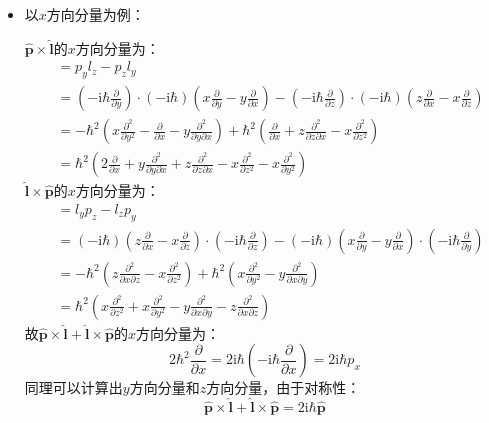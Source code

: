 \documentclass[a4paper,fontset=none]{ctexart}
\begin{document}
\begin{itemize}
        \item[1.30]
        以$x$方向分量为例：

        $\hat{\bm{p}} \times \hat{\bm{l}}$的$x$方向分量为：
        \begin{align*}
            [p_y,l_z]
            &= p_y l_z - p_z l_y \\
            &= \left(-\mathrm{i}\hbar\frac{\partial}{\partial y}\right) \cdot (-\mathrm{i}\hbar)\left(x\frac{\partial}{\partial y} - y\frac{\partial}{\partial x}\right) - \left(-\mathrm{i}\hbar\frac{\partial}{\partial z}\right) \cdot (-\mathrm{i}\hbar)\left(z\frac{\partial}{\partial x} - x\frac{\partial}{\partial z}\right) \\
            &= -\hbar^2\left(x\frac{\partial^2}{\partial y^2} - \frac{\partial}{\partial x} - y\frac{\partial^2}{\partial y \partial x}\right) + \hbar^2\left(\frac{\partial}{\partial x} + z\frac{\partial^2}{\partial z \partial x} - x\frac{\partial^2}{\partial z^2}\right) \\
            &= \hbar^2\left(2\frac{\partial}{\partial x} + y\frac{\partial^2}{\partial y \partial x} + z\frac{\partial^2}{\partial z \partial x} - x\frac{\partial^2}{\partial z^2} - x\frac{\partial^2}{\partial y^2}\right)
        \end{align*}
        $\hat{\bm{l}} \times \hat{\bm{p}}$的$x$方向分量为：
        \begin{align*}
            [l_y,p_z]
            &= l_y p_z - l_z p_y \\
            &= (-\mathrm{i}\hbar)\left(z\frac{\partial}{\partial x} - x\frac{\partial}{\partial z}\right) \cdot \left(-\mathrm{i}\hbar\frac{\partial}{\partial z}\right) - (-\mathrm{i}\hbar)\left(x\frac{\partial}{\partial y} - y\frac{\partial}{\partial x}\right) \cdot \left(-\mathrm{i}\hbar\frac{\partial}{\partial y}\right) \\
            &= -\hbar^2\left(z\frac{\partial^2}{\partial x \partial z} - x\frac{\partial^2}{\partial z^2}\right) + \hbar^2\left(x\frac{\partial^2}{\partial y^2} - y\frac{\partial^2}{\partial x \partial y}\right) \\
            &= \hbar^2\left(x\frac{\partial^2}{\partial z^2} + x\frac{\partial^2}{\partial y^2} - y\frac{\partial^2}{\partial x \partial y} - z\frac{\partial^2}{\partial x \partial z}\right)
        \end{align*}
        故$\hat{\bm{p}} \times \hat{\bm{l}} + \hat{\bm{l}} \times \hat{\bm{p}}$的$x$方向分量为：
        \[
        2\hbar^2\frac{\partial}{\partial x}
        = 2\mathrm{i}\hbar\left(-\mathrm{i}\hbar\frac{\partial}{\partial x}\right)
        = 2\mathrm{i}\hbar p_x
        \]
        同理可以计算出$y$方向分量和$z$方向分量，由于对称性：
        \[
        \hat{\bm{p}} \times \hat{\bm{l}} + \hat{\bm{l}} \times \hat{\bm{p}} = 2\mathrm{i}\hbar\hat{\bm{p}}
        \]

    \end{itemize}
\end{document}
